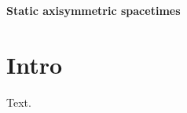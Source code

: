 \documentclass{article}
\def\title#1{\begin{center}\normalsize\bf #1\end{center}}
\begin{document}
\begin{titlepage}
\title{Static axisymmetric spacetimes}
\maketitle
\end{titlepage}
\section{Intro}
Text.
\end{document}
